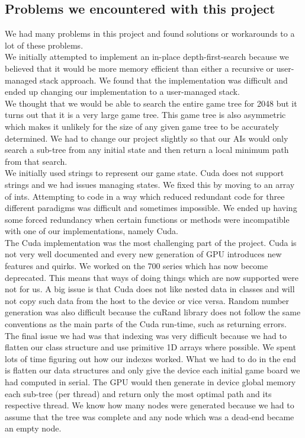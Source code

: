 \documentclass[a4paper]{report}
\begin{document}
\subsection{Problems we encountered with this project}
We had many problems in this project and found solutions or workarounds to a lot of these problems.\\

We initially attempted to implement an in-place depth-first-search because we believed that it would be more memory efficient than either a recursive or user-managed stack approach. We found that the implementation was difficult and ended up changing our implementation to a user-managed stack.\\

We thought that we would be able to search the entire game tree for 2048 but it turns out that it is a very large game tree. This game tree is also asymmetric which makes it unlikely for the size of any given game tree to be accurately determined. We had to change our project slightly so that our AIs would only search a sub-tree from any initial state and then return a local minimum path from that search.\\

We initially used strings to represent our game state. Cuda does not support strings and we had issues managing states. We fixed this by moving to an array of ints.
Attempting to code in a way which reduced redundant code for three different paradigms was difficult and sometimes impossible. We ended up having some forced redundancy when certain functions or methods were incompatible with one of our implementations, namely Cuda.\\

The Cuda implementation was the most challenging part of the project. Cuda is not very well documented and every new generation of GPU introduces new features and quirks. We worked on the 700 series which has now become deprecated. This means that ways of doing things which are now supported were not for us. A big issue is that Cuda does not like nested data in classes and will not copy such data from the host to the device or vice versa. Random number generation was also difficult because the cuRand library does not follow the same conventions as the main parts of the Cuda run-time, such as returning errors. The final issue we had was that indexing was very difficult because we had to flatten our class structure and use primitive 1D arrays where possible. We spent lots of time figuring out how our indexes worked. What we had to do in the end is flatten our data structures and only give the device each initial game board we had computed in serial. The GPU would then generate in device global memory each sub-tree (per thread) and return only the most optimal path and its respective thread. We know how many nodes were generated because we had to assume that the tree was complete and any node which was a dead-end became an empty node.\\
\end{document}
